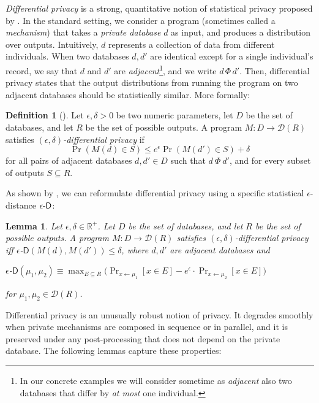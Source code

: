\documentclass{sig-alternate-05-2015}
\theoremstyle{plain}
\newtheorem{lemma}{Lemma}[section]
\theoremstyle{definition}
\newtheorem{definition}{Definition}[section]
\theoremstyle{corollary}
\def\R{\mathbb{R}}
\newcommand{\rplus}{\R^+}
\newcommand{\distr}{\mathcal{D}}
\begin{document}
\emph{Differential privacy} is a strong,
quantitative notion of statistical privacy proposed by \citet{DMNS06}. In the
standard setting, we consider a program (sometimes called a \emph{mechanism})
that takes a \emph{private database} $d$ as input, and produces a distribution
over outputs. Intuitively, $d$ represents a collection of data from different
individuals. When two databases $d, d'$ are identical except for a single
individual's record, we say that $d$ and $d'$ are
\emph{adjacent}\footnote{In our concrete examples we will consider
  sometime as \emph{adjacent} also two
  databases that differ by \emph{at most} one individual.}, and we write
$d\, \Phi\, d'$. Then, differential privacy states that the output distributions
from running the program on two adjacent databases should be statistically
similar. More formally:
\begin{definition}[\citet{DMNS06}]
\label{def:dp}
  Let $\epsilon, \delta > 0$ be two numeric parameters, let $D$ be the set of
  databases, and let $R$ be the set of possible outputs. A program $M : D \to
  \distr(R)$ satisfies \emph{$(\epsilon, \delta)$-differential privacy} if
  \[
    \Pr( M(d) \in S ) \leq e^\epsilon \Pr( M(d') \in S ) + \delta
  \]
  for all pairs of adjacent databases $d, d' \in D$ such that $d\ \Phi\ d'$, and
  for every subset of outputs $S \subseteq R$.
\end{definition}
As shown by \citet{POPL:BKOZ12}, we can reformulate differential privacy using a specific statistical
$\epsilon$-distance $\epsilon\textnormal{-}\mathsf{D}$:
\begin{lemma}
\label{lem:eps-dist}
  Let $\epsilon, \delta \in \rplus $. Let $D$ be the set of databases, and let
  $R$ be the set of possible outputs. A program $M : D \to \distr(R)$ satisfies
  \emph{$(\epsilon, \delta)$-differential privacy} iff
  $\epsilon$-$\mathsf{D}(M(d), M(d'))\leq \delta$, where $d,d'$ are adjacent
  databases and
\begin{center}
$\epsilon$-$\mathsf{D}(\mu_1,\mu_2)\equiv\displaystyle \max_{E\subseteq R} \big( \Pr_{x\leftarrow \mu_1} [x\in E] - e^{\epsilon}\cdot\Pr_{x\leftarrow \mu_2}[x\in E] \big)$
\end{center} for $\mu_1, \mu_2\in \distr(R)$.
\end{lemma}
Differential privacy is an unusually robust notion of privacy. It degrades
smoothly when private mechanisms are composed in sequence or in parallel, and it
is preserved under any post-processing that does not depend on the private
database. The following lemmas capture these properties:
\end{document}
